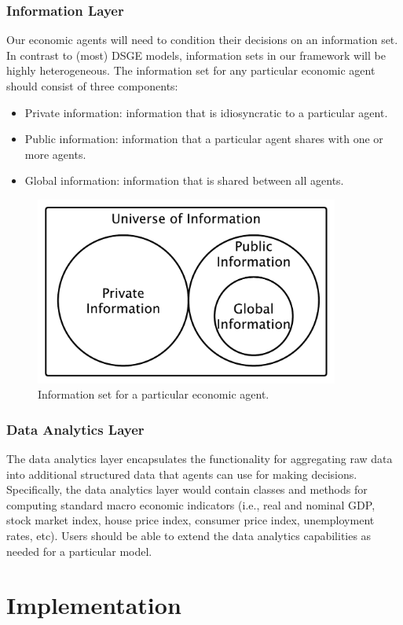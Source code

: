 \documentclass[11pt]{amsart}
\begin{document}
\subsubsection{Information Layer}
Our economic agents will need to condition their decisions on an information set.  In contrast to (most) DSGE models, information sets in our framework will be highly heterogeneous. The information set for any particular economic agent should consist of three components:
\begin{itemize}
    \item Private information: information that is idiosyncratic to a particular agent. 
    \item Public information: information that a particular agent shares with one or more agents.
    \item Global information: information that is shared between all agents.
\end{itemize}
\begin{figure}[H]
\centering
\includegraphics[width=10cm]{img/information-sets.pdf}
\caption{Information set for a particular economic agent.}
\end{figure}

\subsubsection{Data Analytics Layer}
The data analytics layer encapsulates the functionality for aggregating raw data into additional structured data that agents can use for making decisions.  Specifically, the data analytics layer would contain classes and methods for computing standard macro economic indicators (i.e., real and nominal GDP, stock market index, house price index, consumer price index, unemployment rates, etc). Users should be able to extend the data analytics capabilities as needed for a particular model.

\section{Implementation}
\end{document}
